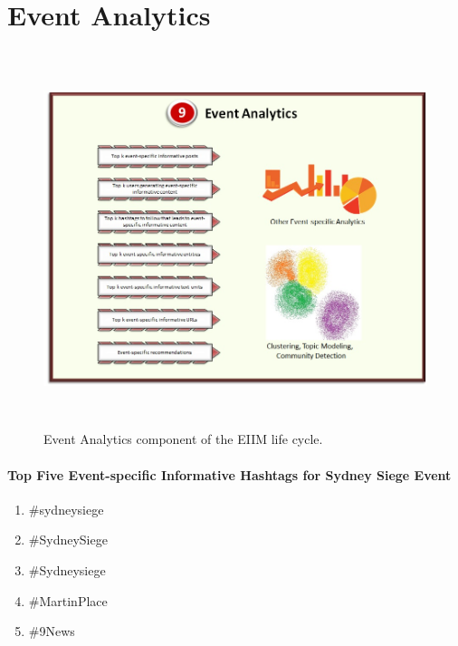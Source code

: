 \section{Event Analytics}
\begin{figure}[htbp]
  \caption{Event Analytics component of the EIIM life cycle.}
  \centering
    \includegraphics[width=14cm,height=11cm]{Figures/EIIMComponents/EventAnalytics.jpg}
\end{figure}

\paragraph{Top Five Event-specific Informative Hashtags for Sydney Siege Event}
\begin{enumerate}
\item \#sydneysiege 
\item \#SydneySiege
\item \#Sydneysiege
\item \#MartinPlace
\item \#9News                                                                                                                                                                                                                                                                                                                                                                                                                                                                                                                 
\end{enumerate}

